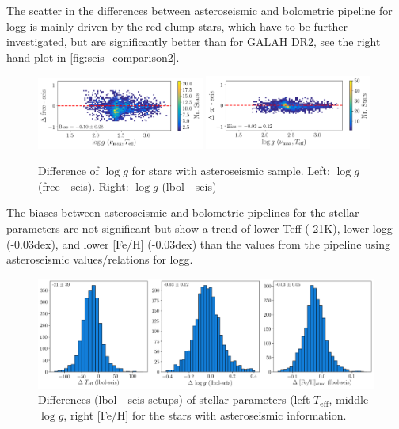 \documentclass[a4paper,11pt,english]{article}
\begin{document}
The scatter in the differences between asteroseismic and bolometric pipeline for logg is mainly driven by the red clump stars, which have to be further investigated, but are significantly better than for GALAH DR2, see the right hand plot in \autoref{fig:seis_comparison2}.

\begin{figure}[!ht]
\centering
\includegraphics[width=0.49\textwidth]{../../seis/figures/seismic_sample_delta_free.png}
\includegraphics[width=0.49\textwidth]{../../seis/figures/seismic_sample_delta_lbol.png}
\caption{Difference of $\log g$ for stars with asteroseismic sample. Left: $\log g$ (free - seis). Right: $\log g$ (lbol - seis)}
\label{fig:seis_comparison2}
\end{figure}

The biases between asteroseismic and bolometric pipelines for the stellar parameters are not significant but show a trend of lower Teff (-21K), lower logg (-0.03dex), and lower [Fe/H] (-0.03dex) than the values from the pipeline using asteroseismic values/relations for logg.

\begin{figure}[!ht]
\centering
\includegraphics[width=\textwidth]{../../seis/figures/seis_setup_difference_lbol.png}
\caption{Differences (lbol - seis setups) of stellar parameters (left $T_\text{eff}$, middle $\log g$, right [Fe/H] for the stars with asteroseismic information.}
\label{fig:seis_comparison3}
\end{figure}
\end{document}
